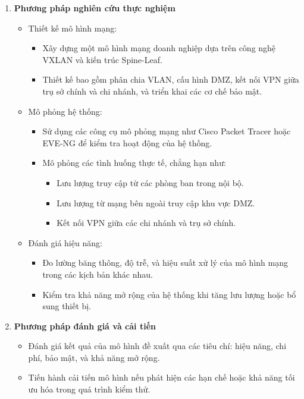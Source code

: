 \documentclass[13pt]{article}
\begin{document}
\begin{enumerate}
        \item \textbf{Phương pháp nghiên cứu thực nghiệm}
        \begin{itemize}
            \item Thiết kế mô hình mạng:
            \begin{itemize}
                \item Xây dựng một mô hình mạng doanh nghiệp dựa trên công nghệ VXLAN và kiến trúc Spine-Leaf.
                \item Thiết kế bao gồm phân chia VLAN, cấu hình DMZ, kết nối VPN giữa trụ sở chính và chi nhánh, và triển khai các cơ chế bảo mật.
            \end{itemize}
            \item Mô phỏng hệ thống:
            \begin{itemize}
                \item Sử dụng các công cụ mô phỏng mạng như Cisco Packet Tracer hoặc EVE-NG để kiểm tra hoạt động của hệ thống.
                \item Mô phỏng các tình huống thực tế, chẳng hạn như:
                \begin{itemize}
                    \item Lưu lượng truy cập từ các phòng ban trong nội bộ.
                    \item Lưu lượng từ mạng bên ngoài truy cập khu vực DMZ.
                    \item Kết nối VPN giữa các chi nhánh và trụ sở chính.
                \end{itemize}
            \end{itemize}
            \item Đánh giá hiệu năng:
            \begin{itemize}
                \item Đo lường băng thông, độ trễ, và hiệu suất xử lý của mô hình mạng trong các kịch bản khác nhau.
                \item Kiểm tra khả năng mở rộng của hệ thống khi tăng lưu lượng hoặc bổ sung thiết bị.
            \end{itemize}
        \end{itemize}

        \item \textbf{Phương pháp đánh giá và cải tiến}
        \begin{itemize}
            \item Đánh giá kết quả của mô hình đề xuất qua các tiêu chí: hiệu năng, chi phí, bảo mật, và khả năng mở rộng.
            \item Tiến hành cải tiến mô hình nếu phát hiện các hạn chế hoặc khả năng tối ưu hóa trong quá trình kiểm thử.
        \end{itemize}
    \end{enumerate}
\end{document}
